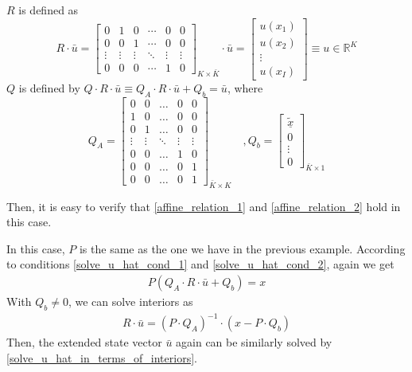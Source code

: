 \documentclass[11pt]{article}
\newcommand{\R}{\ensuremath{\mathbb{R}}}
\begin{document}
$R$ is defined as
\begin{equation}
R\cdot \bar{u} =\begin{bmatrix}
0&1&0&\cdots&0&0\\
0&0&1&\cdots&0&0\\
\vdots&\vdots&\vdots&\ddots&\vdots&\vdots\\
0&0&0&\cdots&1&0
\end{bmatrix}_{K\times\bar{K}}\cdot \bar{u}
=\begin{bmatrix}
u(x_1)\\
u(x_2)\\
\vdots\\
u(x_I)
\end{bmatrix} \equiv u\in \R^{K}
\end{equation}
$Q$ is defined by $Q\cdot R\cdot\bar{u}\equiv Q_A\cdot R\cdot\bar{u}+Q_b = \bar{u}$, where
\begin{equation}
Q_A = \begin{bmatrix}
0& 0&\dots&0&0\\
1&0&\dots&0&0\\
0&1&\dots&0&0\\
\vdots&\vdots&\ddots&\vdots&\vdots\\
0&0&\dots&1&0\\
0&0&\dots&0&1\\
0&0&\dots&0&1
\end{bmatrix}_{\bar{K}\times K}\quad , Q_b = \begin{bmatrix}
\underline{\tilde{x}}\\
0\\
\vdots\\
0
\end{bmatrix}_{\bar{K}\times 1}
\end{equation}

Then, it is easy to verify that \eqref{affine_relation_1} and \eqref{affine_relation_2} hold in this case.

In this case, $P$ is the same as the one we have in the previous example. According to conditions \eqref{solve_u_hat_cond_1} and \eqref{solve_u_hat_cond_2}, again we get
\begin{align}
P(Q_A\cdot R\cdot \bar{u}+Q_b) = x
\end{align}
With $Q_b\neq 0$, we can solve interiors as
\begin{align}
R\cdot\bar{u} = (P\cdot Q_A)^{-1}\cdot(x-P\cdot Q_b)
\end{align}
Then, the extended state vector $\bar{u}$ again can be similarly solved by \eqref{solve_u_hat_in_terms_of_interiors}.
\end{document}
